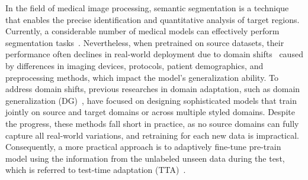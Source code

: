 In the field of medical image processing, semantic segmentation is a technique that enables the precise identification and quantitative analysis of target regions. 
Currently, a considerable number of medical models can effectively perform segmentation tasks~\cite{azad2024medical,ma2024segment}. Nevertheless, when pretrained on source datasets, their performance often declines in real-world deployment due to domain shifts~\cite{moreno2012unifying,zhang2021adaptive} caused by differences in imaging devices, protocols, patient demographics, and preprocessing methods, which impact the model's generalization ability.
To address domain shifts, previous researches in domain adaptation, such as domain generalization (DG)~\cite{wang2022generalizing,zhou2022domain,yoon2023domain}, have focused on designing sophisticated models that train jointly on source and target domains or across multiple styled domains.
Despite the progress, these methods fall short in practice, as no source domains can fully capture all real-world variations, and retraining for each new data is impractical. Consequently, a more practical approach is to adaptively fine-tune pre-train model using the information from the unlabeled unseen data during the test, which is referred to test-time adaptation (TTA)~\cite{liang2024comprehensive}.

